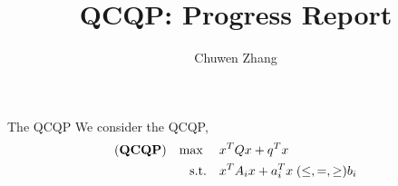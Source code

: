 \documentclass[aspectratio=1610, 9pt]{beamer}
\newcommand{\model}[1]{(\textbf{#1})}
\newcommand{\mx}{\mathbf{\max}\;}
\begin{document}
\title{QCQP: Progress Report}

\author{
  Chuwen Zhang
}
\maketitle


\begin{frame}{The QCQP}
  We consider the QCQP,
  \begin{equation}
    \label{eq:inhoqcqp}
    \begin{aligned}
      \model{QCQP} \quad \mx \quad & x^T Qx + q^T x                                        \\
      \textrm{s.t.} \quad          & x^T A_i x + a_i^T x \hspace{0.27em} (\le, =, \ge) b_i \\
    \end{aligned}
  \end{equation}
\end{frame}
\end{document}
